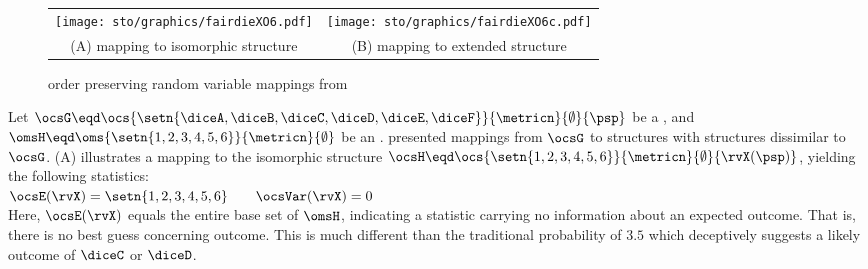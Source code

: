 \begin{tabstr}{0.75}
\begin{figure}[h][h]
  \centering%
  \gsize%
  \begin{tabular}{c@{\qquad\qquad}c}
    {\texttt{[image: sto/graphics/fairdieXO6.pdf]}}&{\texttt{[image: sto/graphics/fairdieXO6c.pdf]}} \\
    (A) mapping to isomorphic structure  & (B) mapping to extended structure
  \end{tabular}
  \caption{order preserving random variable mappings from \label{fig:fairdieXO6}}
\end{figure}
\begin{example}
\label{ex:fdieXO6}
Let $\ocsG\eqd\ocs{\setn{\diceA,\diceB,\diceC,\diceD,\diceE,\diceF}}{\metricn}{\emptyset}{\psp}$ 
be a  ,
and $\omsH\eqd\oms{\setn{1,2,3,4,5,6}}{\metricn}{\emptyset}$ 
be an  .
 presented mappings from $\ocsG$ to structures with structures dissimilar to $\ocsG$.
 (A) illustrates a mapping to the isomorphic structure
$\ocsH\eqd\ocs{\setn{1,2,3,4,5,6}}{\metricn}{\emptyset}{\rvX(\psp)}$,
yielding the following statistics:
\\\indentx$
  \ocsE(\rvX)  = \setn{1,2,3,4,5,6} \qquad \ocsVar(\rvX)  = 0
  $\\
Here, $\ocsE(\rvX)$ equals the entire base set of $\omsH$, 
indicating a statistic carrying no information about an expected outcome.
That is, there is no best guess concerning outcome.
This is much different than the traditional probability of $3.5$  which 
deceptively suggests a likely outcome of $\diceC$ or $\diceD$.

\end{example}
\end{tabstr}
